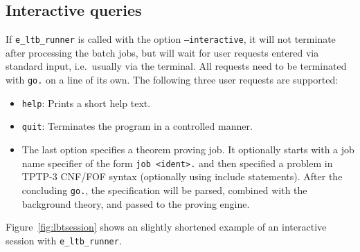 \documentclass{report}
\begin{document}
\subsection{Interactive queries}
\label{sec:iq}

If \texttt{e\_ltb\_runner} is called with the option
\texttt{--interactive}, it will not terminate after processing the
batch jobs, but will wait for user requests entered via standard
input, i.e.\ usually via the terminal. All requests need to be
terminated with \texttt{go.} on a line of its own. The following three
user requests are supported:

\begin{itemize}
\item \texttt{help}: Prints a short help text.
\item \texttt{quit}: Terminates the program in a controlled manner.
\item The last option specifies a theorem proving job. It optionally
  starts with a job name specifier of the form \texttt{job <ident>.}
  and then specified a problem in TPTP-3 CNF/FOF syntax (optionally
  using include statements). After the concluding \texttt{go.}, the
  specification will be parsed, combined with the background theory,
  and passed to the proving engine.
\end{itemize}

Figure~\ref{fig:lbtsession} shows an slightly shortened example of an
interactive session with \texttt{e\_ltb\_runner}.
\end{document}
